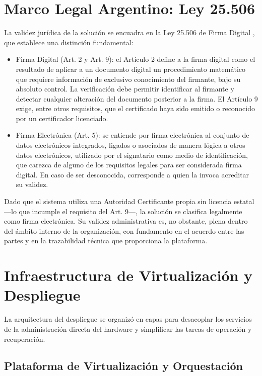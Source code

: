 \section{Marco Legal Argentino: Ley 25.506}
\label{sec:marco_legal}

La validez jurídica de la solución se encuadra en la Ley 25.506 de Firma Digital \cite{ley25506}, que establece una distinción fundamental:

\begin{itemize}
    \item Firma Digital (Art. 2 y Art. 9): el Artículo 2 define a la firma digital como el resultado de aplicar a un documento digital un procedimiento matemático que requiere información de exclusivo conocimiento del firmante, bajo su absoluto control. La verificación debe permitir identificar al firmante y detectar cualquier alteración del documento posterior a la firma. El Artículo 9 exige, entre otros requisitos, que el certificado haya sido emitido o reconocido por un certificador licenciado.
    \item Firma Electrónica (Art. 5): se entiende por firma electrónica al conjunto de datos electrónicos integrados, ligados o asociados de manera lógica a otros datos electrónicos, utilizado por el signatario como medio de identificación, que carezca de alguno de los requisitos legales para ser considerada firma digital. En caso de ser desconocida, corresponde a quien la invoca acreditar su validez.
\end{itemize}

Dado que el sistema utiliza una Autoridad Certificante propia sin licencia estatal ---lo que incumple el requisito del Art. 9---, la solución se clasifica legalmente como firma electrónica. Su validez administrativa es, no obstante, plena dentro del ámbito interno de la organización, con fundamento en el acuerdo entre las partes y en la trazabilidad técnica que proporciona la plataforma.

\section{Infraestructura de Virtualización y Despliegue}
\label{sec:infraestructura}

La arquitectura del despliegue se organizó en capas para desacoplar los servicios de la administración directa del hardware y simplificar las tareas de operación y recuperación.

\subsection{Plataforma de Virtualización y Orquestación}

